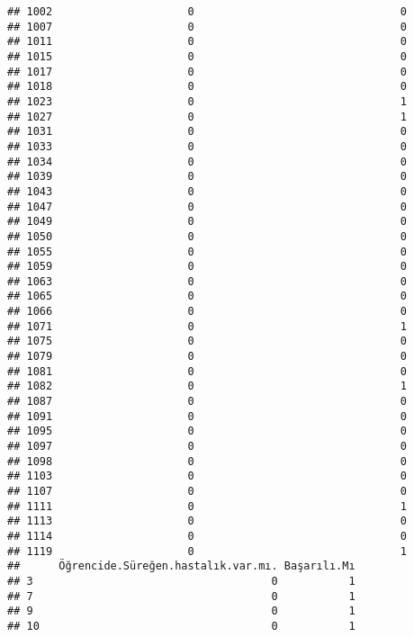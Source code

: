 \documentclass[
]{article}
\begin{document}
\begin{verbatim}
## 1002                     0                                0
## 1007                     0                                0
## 1011                     0                                0
## 1015                     0                                0
## 1017                     0                                0
## 1018                     0                                0
## 1023                     0                                1
## 1027                     0                                1
## 1031                     0                                0
## 1033                     0                                0
## 1034                     0                                0
## 1039                     0                                0
## 1043                     0                                0
## 1047                     0                                0
## 1049                     0                                0
## 1050                     0                                0
## 1055                     0                                0
## 1059                     0                                0
## 1063                     0                                0
## 1065                     0                                0
## 1066                     0                                0
## 1071                     0                                1
## 1075                     0                                0
## 1079                     0                                0
## 1081                     0                                0
## 1082                     0                                1
## 1087                     0                                0
## 1091                     0                                0
## 1095                     0                                0
## 1097                     0                                0
## 1098                     0                                0
## 1103                     0                                0
## 1107                     0                                0
## 1111                     0                                1
## 1113                     0                                0
## 1114                     0                                0
## 1119                     0                                1
##      Öğrencide.Süreğen.hastalık.var.mı. Başarılı.Mı
## 3                                     0           1
## 7                                     0           1
## 9                                     0           1
## 10                                    0           1

\end{verbatim}
\end{document}
